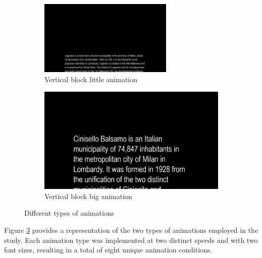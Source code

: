 \documentclass{article}
\begin{document}
\begin{figure}[ht]
    \begin{subfigure}[b]{0.45\textwidth}
        \centering
        \includegraphics[width=0.7\textwidth,height=0.6\textwidth]{Images/Experiment/VB_little.png}
        \caption{Vertical block little animation}
        \label{fig:VB_L}
    \end{subfigure}
    \hfill
    \begin{subfigure}[b]{0.45\textwidth}
        \centering
        \includegraphics[width=1\textwidth,height=0.6\textwidth]{Images/Experiment/VB_big.png}
        \caption{Vertical block big animation}
        \label{fig:VB_B}
    \end{subfigure}

    \caption{Different types of animations}
    \label{fig:anims}
\end{figure}

Figure \ref{fig:anims} provides a representation of the two types of animations employed in the study. 
Each animation type was implemented at two distinct speeds and with two font sizes, resulting in a total of eight unique animation conditions.
\end{document}
